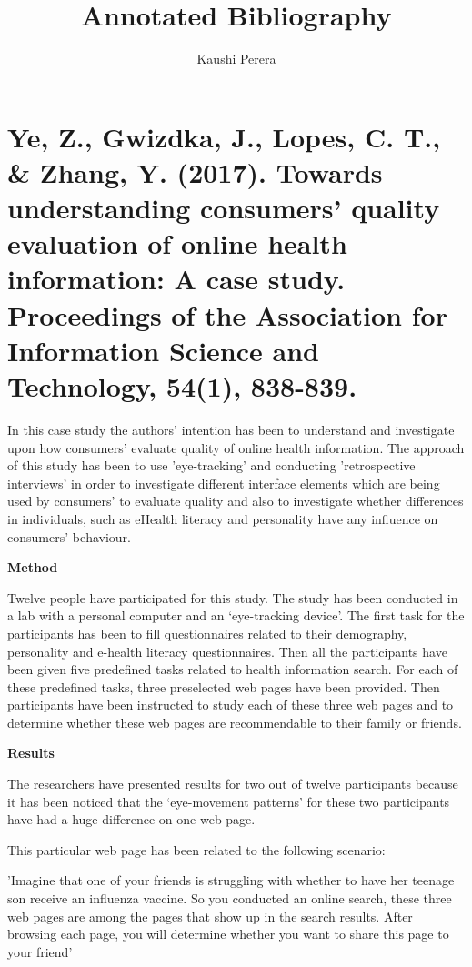 \documentclass[]{article}
\title{Annotated Bibliography}
\author{Kaushi Perera}
\begin{document}
\maketitle


\section{Ye, Z., Gwizdka, J., Lopes, C. T., \& Zhang, Y. (2017). Towards understanding consumers' quality evaluation of online health information: A case study. Proceedings of the Association for Information Science and Technology, 54(1), 838-839.}

In this case study the authors' intention has been to understand and investigate upon how consumers' evaluate quality of online health information. The approach of this study has been to use 'eye-tracking' and conducting 'retrospective interviews' in order to investigate different interface elements which are being used by consumers' to evaluate quality and also to investigate whether differences in individuals, such as eHealth literacy and personality have any influence on consumers' behaviour.     


\textbf{Method}

Twelve people have participated for this study. The study has been conducted in a lab with a personal computer and an ‘eye-tracking device’. The first task for the participants has been to fill questionnaires related to their demography, personality and e-health literacy questionnaires. Then all the participants have been given five predefined tasks related to health information search. For each of these predefined tasks, three preselected web pages have been provided. Then participants have been instructed to study each of these three web pages and to determine whether these web pages are recommendable to their family or friends. 

\textbf{Results}

The researchers have presented results for two out of twelve participants because it has been noticed that the ‘eye-movement patterns’ for these two participants have had a huge difference on one web page.

This particular web page has been related to the following scenario:

'Imagine that one of your friends is struggling with whether to have her teenage son receive an influenza vaccine. So you conducted an online search, these three web pages are among the pages that show up in the search results. After browsing each page, you will determine whether you want to share this page to your friend'
\end{document}
